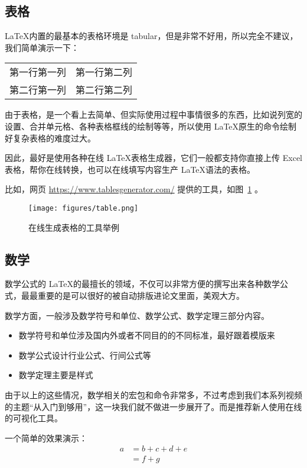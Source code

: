 
\newpage

\subsection{表格}
\LaTeX 内置的最基本的表格环境是 tabular，但是非常不好用，所以完全不建议，我们简单演示一下：\par

\begin{tabular}{c|c}
     第一行第一列&第一行第二列  \\
     第二行第一列&第二行第二列 
\end{tabular}


由于表格，是一个看上去简单、但实际使用过程中事情很多的东西，比如说列宽的设置、合并单元格、各种表格框线的绘制等等，所以使用 \LaTeX 原生的命令绘制好复杂表格的难度过大。\par

因此，最好是使用各种在线 \LaTeX 表格生成器，它们一般都支持你直接上传 Excel 表格，帮你在线转换，也可以在线填写内容生产 \LaTeX 语法的表格。 \par
比如，网页 \url{https://www.tablesgenerator.com/} 提供的工具，如图~\ref{fig:tableTool} 。

\begin{figure}[ht]
    \centering
    \texttt{[image: figures/table.png]}
    \caption{在线生成表格的工具举例}
    \label{fig:tableTool}
\end{figure}

\newpage

\subsection{数学}
数学公式的 \LaTeX 的最擅长的领域，不仅可以非常方便的撰写出来各种数学公式，最最重要的是可以很好的被自动排版进论文里面，美观大方。\par

数学方面，一般涉及数学符号和单位、数学公式、数学定理三部分内容。
\begin{itemize}
    \item 数学符号和单位涉及国内外或者不同目的的不同标准，最好跟着模版来
    \item 数学公式设计行业公式、行间公式等
    \item 数学定理主要是样式
\end{itemize}
由于以上的这些情况，数学相关的宏包和命令非常多，不过考虑到我们本系列视频的主题“从入门到够用”，这一块我们就不做进一步展开了。而是推荐新人使用在线的可视化工具。\par
一个简单的效果演示：
\begin{align}
  a & = b + c + d + e \\
    & = f + g
\end{align}

